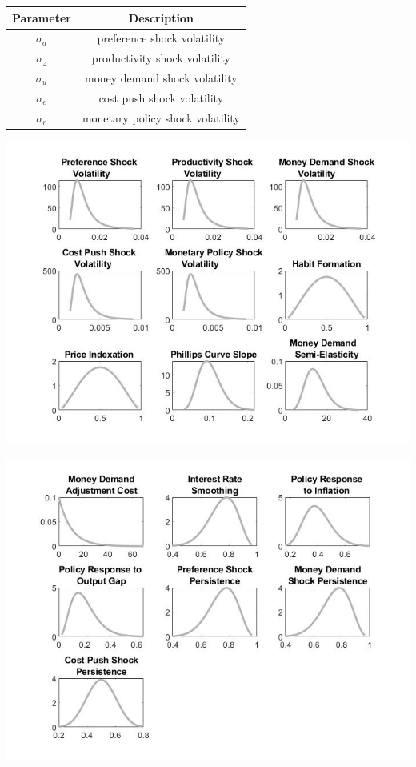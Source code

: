 \documentclass[11pt,preprint, authoryear]{elsarticle}
\let\origfigure\figure
\let\endorigfigure\endfigure
\renewenvironment{figure}[1][2] {
    \expandafter\origfigure\expandafter[H]
} {
    \endorigfigure
}
\let\origtable\table
\let\endorigtable\endtable
\renewenvironment{table}[1][2] {
    \expandafter\origtable\expandafter[H]
} {
    \endorigtable
}
\numberwithin{equation}{section}
\numberwithin{figure}{section}
\numberwithin{table}{section}
\begin{document}
\begin{table}
\caption{Exogenous Variables}
 \label{Table:enx}
 \begin{center}
\begin{tabular}{|c|c|} 
\hline
  Parameter & Description \\ 
\hline
 ${\sigma_a}$ & preference shock volatility\\
 ${\sigma_z}$ & productivity shock volatility\\
 ${\sigma_u}$ & money demand shock volatility\\
 ${\sigma_e}$ & cost push shock volatility\\
 ${\sigma_r}$ & monetary policy shock volatility\\
\hline
\end{tabular}
\end{center}
\end{table}

\begin{figure}
\caption{(a) Prior Distributions}
\centering
\includegraphics[scale=0.5]{prior.jpg}
\label{fig:prior1}
\end{figure}

\begin{figure}
\caption{(b) Prior Distributions}
\centering
\includegraphics[scale=0.5]{prior_1.jpg}
\label{fig:prior2}
\end{figure}
\end{document}
